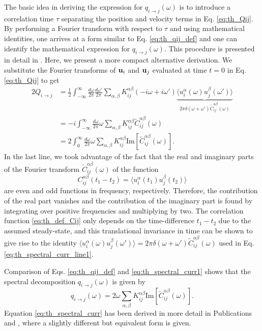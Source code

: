 The basic idea in deriving the expression for $q_{i\to j}(\omega)$ is to introduce a correlation time $\tau$ separating the position and velocity terms in Eq. \eqref{eq:th_Qij}. By performing a Fourier transform with respect to $\tau$ and using mathematical identities, one arrives at a form similar to Eq. \eqref{eq:th_qij_def} and one can identify the mathematical expression for $q_{i \to j}(\omega)$. This procedure is presented in detail in . Here, we present a more compact alternative derivation. We substitute the Fourier transforms of $\mathbf{u}_i$ and $\mathbf{u}_j$ evaluated at time $t=0$ in Eq. \eqref{eq:th_Qij} to get
\begin{alignat}{2}
 Q_{i\to j} &= \frac{1}{2} \int_{-\infty}^{\infty} \frac{d\omega}{2\pi} \frac{d\omega'}{2\pi} \sum_{\alpha,\beta} K_{ij}^{\alpha\beta} (-i\omega+i\omega') \underbrace{\langle u_i^{\alpha}(\omega) u_j^{\beta}(\omega') \rangle}_{2\pi \delta(\omega+\omega')\tilde C_{ij}^{\alpha\beta}(\omega)} \label{eq:th_spectral_curr_line1} \\
  &= -i   \int_{-\infty}^{\infty} \frac{d\omega}{2\pi} \omega \sum_{\alpha,\beta} K_{ij}^{\alpha\beta} \tilde C_{ij}^{\alpha\beta}(\omega) \label{eq:th_spectral_curr_line2} \\
  &=  2 \int_{0}^{\infty}\frac{d\omega}{2\pi} \omega \sum_{\alpha,\beta} K_{ij}^{\alpha\beta} \textrm{Im}[\tilde C_{ij}^{\alpha\beta}(\omega)]. \label{eq:th_spectral_curr1}
\end{alignat}
In the last line, we took advantage of the fact that the real and imaginary parts of the Fourier transform $\tilde{C}_{ij}^{\alpha\beta}(\omega)$ of the function
\begin{equation}
 C_{ij}^{\alpha\beta}(t_1-t_2) = \langle u_i^{\alpha}(t_1)u_j^{\beta}(t_2) \rangle \label{eq:th_def_Cij} 
\end{equation}
are even and odd functions in frequency, respectively. Therefore, the contribution of the real part vanishes and the contribution of the imaginary part is found by integrating over positive frequencies and multiplying by two. The correlation function \eqref{eq:th_def_Cij} only depends on the time-difference $t_1-t_2$ due to the assumed steady-state, and this translational invariance in time can be shown to give rise to the identity $\langle u_i^{\alpha}(\omega) u_j^{\beta}(\omega') \rangle = 2\pi \delta(\omega+\omega')\tilde C_{ij}^{\alpha\beta}(\omega)$ used in Eq. \eqref{eq:th_spectral_curr_line1}. 

Comparison of Eqs. \eqref{eq:th_qij_def} and \eqref{eq:th_spectral_curr1} shows that the spectral decomposition $q_{i\to j}(\omega)$ is given by 
\begin{equation}
 q_{i\to j}(\omega) = 2  \omega \sum_{\alpha,\beta} K_{ij}^{\alpha\beta} \textrm{Im}[\tilde C_{ij}^{\alpha\beta}(\omega)]. \label{eq:th_spectral_curr}
\end{equation}
Equation \eqref{eq:th_spectral_curr} has been derived in more detail in Publications  and , where a slightly different but equivalent form is given. 

